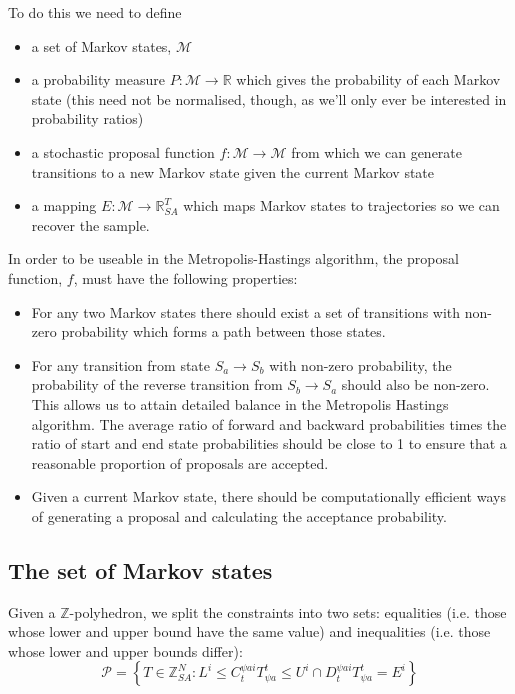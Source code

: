 \documentclass{article}
\begin{document}
To do this we need to define
\begin{itemize}
\item a set of Markov states, $\mathcal{M}$

\item a probability measure $P: \mathcal{M} \to \mathbb{R}$ which gives the probability of each Markov state (this need not be normalised, though, as we'll only ever be interested in probability ratios)

\item a stochastic proposal function $f:\mathcal{M} \to \mathcal{M}$ from which we can generate transitions to a new Markov state given the current Markov state

\item a mapping $E:\mathcal{M} \to \mathbb{R}^T_{SA}$ which maps Markov states to trajectories so we can recover the sample.
\end{itemize}

In order to be useable in the Metropolis-Hastings algorithm, the proposal function, $f$, must have the following properties:
\begin{itemize}
	\item For any two Markov states there should exist a set of transitions with non-zero probability which forms a path between those states.
	
	\item For any transition from state $S_a \to S_b$ with non-zero probability, the probability of the reverse transition from $S_b \to S_a$ should also be non-zero. This allows us to attain detailed balance in the Metropolis Hastings algorithm. The average ratio of forward and backward probabilities times the ratio of start and end state probabilities should be close to 1 to ensure that a reasonable proportion of proposals are accepted.
	
	\item Given a current Markov state, there should be computationally efficient ways of generating a proposal and calculating the acceptance probability. 
\end{itemize}


\subsection{The set of Markov states}

Given a $\mathbb{Z}$-polyhedron, we split the constraints into two sets: equalities (i.e. those whose lower and upper bound have the same value) and inequalities (i.e. those whose lower and upper bounds differ):
\begin{equation}
\mathcal{P} = \left\{T \in \mathbb{Z}^N_{SA}: L^i \le C^{\psi ai}_t T^t_{\psi a} \le U^i \cap D^{\psi ai}_t T^t_{\psi a} = E^i \right\}
\label{zPolySupport}
\end{equation}
\end{document}
